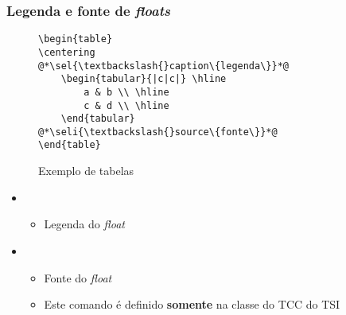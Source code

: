 \begin{frame}[fragile,label={slide:floatcaptionsource}] \frametitle{Legenda e fonte de \textit{floats}}
\vspace{-0.5cm}
\begin{figure}[!t]
\caption{Exemplo de tabelas}
\begin{lstlisting}
\begin{table}
\centering
@*\sel{\textbackslash{}caption\{legenda\}}*@
	\begin{tabular}{|c|c|} \hline
		a & b \\ \hline
		c & d \\ \hline
	\end{tabular}
@*\seli{\textbackslash{}source\{fonte\}}*@
\end{table}
\end{lstlisting}
\ownsrc
\end{figure}

\begin{itemize}
	\item {}
	\begin{itemize}
		\item Legenda do \textit{float}
	\end{itemize}
	\item {}
	\begin{itemize}
		\item Fonte do \textit{float}
		\item Este comando é definido \textbf{somente} na classe do TCC do TSI
	\end{itemize}
\end{itemize}
\end{frame}

